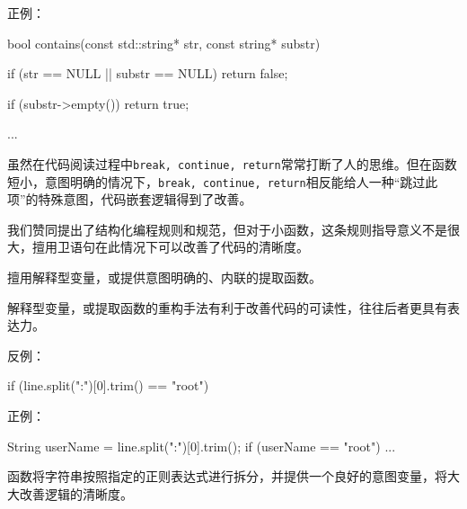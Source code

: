 \begin{content}
正例：
\begin{leftbar}
\begin{c++}
bool contains(const std::string* str, const string* substr) 
{
    if (str == NULL || substr == NULL)
        return false;
    
    if (substr->empty()) 
        return true;

    ...
}
\end{c++}
\end{leftbar}

虽然在代码阅读过程中\texttt{break, continue, return}常常打断了人的思维。但在函数短小，意图明确的情况下，\texttt{break, continue, return}相反能给人一种“跳过此项”的特殊意图，代码嵌套逻辑得到了改善。

我们赞同提出了结构化编程规则和规范，但对于小函数，这条规则指导意义不是很大，擅用卫语句在此情况下可以改善了代码的清晰度。

\begin{regulation}
擅用解释型变量，或提供意图明确的、内联的提取函数。
\end{regulation}

解释型变量，或提取函数的重构手法有利于改善代码的可读性，往往后者更具有表达力。

反例：
\begin{leftbar}
\begin{c++}
if (line.split(":")[0].trim() == "root")
\end{c++}
\end{leftbar}

正例：
\begin{leftbar}
\begin{c++}
String userName = line.split(":")[0].trim();
if (userName == "root")
{
    ...
}
\end{c++}
\end{leftbar}

函数将字符串按照指定的正则表达式进行拆分，并提供一个良好的意图变量，将大大改善逻辑的清晰度。

\end{content}
